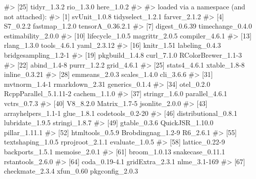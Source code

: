 \documentclass[
  italian,
  letterpaper,
  a4paper,
  11pt,
  open=any]{scrbook}
\newenvironment{Shaded}{\begin{snugshade}}{\end{snugshade}}
\newcommand{\CommentTok}[1]{\textcolor[rgb]{0.37,0.37,0.37}{#1}}
\theoremstyle{plain}
\theoremstyle{definition}
\theoremstyle{definition}
\theoremstyle{remark}
\begin{document}
\begin{tcolorbox}
\begin{Shaded}
\begin{Highlighting}[]
\CommentTok{\#\textgreater{} [25] tidyr\_1.3.2           rio\_1.3.0             here\_1.0.2           }
\CommentTok{\#\textgreater{} }
\CommentTok{\#\textgreater{} loaded via a namespace (and not attached):}
\CommentTok{\#\textgreater{}  [1] svUnit\_1.0.8          tidyselect\_1.2.1      farver\_2.1.2         }
\CommentTok{\#\textgreater{}  [4] S7\_0.2.2              fastmap\_1.2.0         tensorA\_0.36.2.1     }
\CommentTok{\#\textgreater{}  [7] digest\_0.6.39         timechange\_0.4.0      estimability\_2.0.0   }
\CommentTok{\#\textgreater{} [10] lifecycle\_1.0.5       magrittr\_2.0.5        compiler\_4.6.1       }
\CommentTok{\#\textgreater{} [13] rlang\_1.3.0           tools\_4.6.1           yaml\_2.3.12          }
\CommentTok{\#\textgreater{} [16] knitr\_1.51            labeling\_0.4.3        bridgesampling\_1.2{-}1 }
\CommentTok{\#\textgreater{} [19] pkgbuild\_1.4.8        curl\_7.1.0            RColorBrewer\_1.1{-}3   }
\CommentTok{\#\textgreater{} [22] abind\_1.4{-}8           purrr\_1.2.2           grid\_4.6.1           }
\CommentTok{\#\textgreater{} [25] stats4\_4.6.1          xtable\_1.8{-}8          inline\_0.3.21        }
\CommentTok{\#\textgreater{} [28] emmeans\_2.0.3         scales\_1.4.0          cli\_3.6.6            }
\CommentTok{\#\textgreater{} [31] mvtnorm\_1.4{-}1         rmarkdown\_2.31        generics\_0.1.4       }
\CommentTok{\#\textgreater{} [34] otel\_0.2.0            RcppParallel\_5.1.11{-}2 cachem\_1.1.0         }
\CommentTok{\#\textgreater{} [37] stringr\_1.6.0         parallel\_4.6.1        vctrs\_0.7.3          }
\CommentTok{\#\textgreater{} [40] V8\_8.2.0              Matrix\_1.7{-}5          jsonlite\_2.0.0       }
\CommentTok{\#\textgreater{} [43] arrayhelpers\_1.1{-}1    glue\_1.8.1            codetools\_0.2{-}20     }
\CommentTok{\#\textgreater{} [46] distributional\_0.8.1  lubridate\_1.9.5       stringi\_1.8.7        }
\CommentTok{\#\textgreater{} [49] gtable\_0.3.6          QuickJSR\_1.10.0       pillar\_1.11.1        }
\CommentTok{\#\textgreater{} [52] htmltools\_0.5.9       Brobdingnag\_1.2{-}9     R6\_2.6.1             }
\CommentTok{\#\textgreater{} [55] textshaping\_1.0.5     rprojroot\_2.1.1       evaluate\_1.0.5       }
\CommentTok{\#\textgreater{} [58] lattice\_0.22{-}9        backports\_1.5.1       memoise\_2.0.1        }
\CommentTok{\#\textgreater{} [61] broom\_1.0.13          snakecase\_0.11.1      rstantools\_2.6.0     }
\CommentTok{\#\textgreater{} [64] coda\_0.19{-}4.1         gridExtra\_2.3.1       nlme\_3.1{-}169         }
\CommentTok{\#\textgreater{} [67] checkmate\_2.3.4       xfun\_0.60             pkgconfig\_2.0.3}
\end{Highlighting}
\end{Shaded}

\end{tcolorbox}
\end{document}

